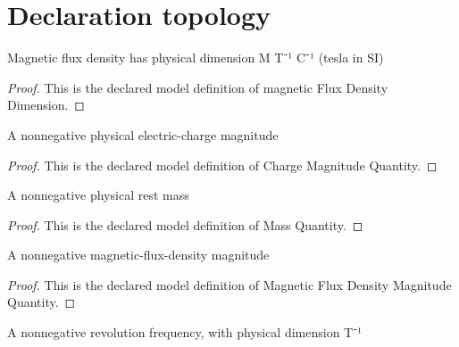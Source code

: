 \section{Declaration topology}
\begin{definition}
  \label{def:physics:phyx-mini-0956:phyxminiproblems-problemphyxmini0956-magneticfluxdensitydimension}
  Magnetic flux density has physical dimension M T⁻¹ C⁻¹ (tesla in SI)
\end{definition}
\begin{proof}
  This is the declared model definition of magnetic Flux Density Dimension.
\end{proof}
\begin{definition}
  \label{def:physics:phyx-mini-0956:phyxminiproblems-problemphyxmini0956-chargemagnitudequantity}
  A nonnegative physical electric-charge magnitude
\end{definition}
\begin{proof}
  This is the declared model definition of Charge Magnitude Quantity.
\end{proof}
\begin{definition}
  \label{def:physics:phyx-mini-0956:phyxminiproblems-problemphyxmini0956-massquantity}
  A nonnegative physical rest mass
\end{definition}
\begin{proof}
  This is the declared model definition of Mass Quantity.
\end{proof}
\begin{definition}
  \label{def:physics:phyx-mini-0956:phyxminiproblems-problemphyxmini0956-magneticfluxdensitymagnitudequantity}
  A nonnegative magnetic-flux-density magnitude
\end{definition}
\begin{proof}
  This is the declared model definition of Magnetic Flux Density Magnitude Quantity.
\end{proof}
\begin{definition}
  \label{def:physics:phyx-mini-0956:phyxminiproblems-problemphyxmini0956-frequencyquantity}
  A nonnegative revolution frequency, with physical dimension T⁻¹
\end{definition}
